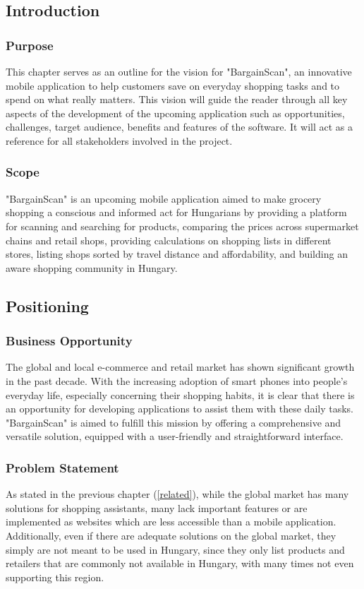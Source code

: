 \subsection{Introduction}

\subsubsection{Purpose}
This chapter serves as an outline for the vision for "BargainScan", an innovative mobile application to help customers save on everyday shopping tasks and to spend on what really matters. This vision will guide the reader through all key aspects of the development of the upcoming application such as opportunities, challenges, target audience, benefits and features of the software. It will act as a reference for all stakeholders involved in the project.

\subsubsection{Scope}
"BargainScan" is an upcoming mobile application aimed to make grocery shopping a conscious and informed act for Hungarians by providing a platform for scanning and searching for products, comparing the prices across supermarket chains and retail shops, providing calculations on shopping lists in different stores, listing shops sorted by travel distance and affordability, and building an aware shopping community in Hungary.

\subsection{Positioning}

\subsubsection{Business Opportunity}
The global and local e-commerce and retail market has shown significant growth in the past decade. With the increasing adoption of smart phones into people's everyday life, especially concerning their shopping habits, it is clear that there is an opportunity for developing applications to assist them with these daily tasks. "BargainScan" is aimed to fulfill this mission by offering a comprehensive and versatile solution, equipped with a user-friendly and straightforward interface.

\subsubsection{Problem Statement} 
As stated in the previous chapter (\ref{related}), while the global market has many solutions for shopping assistants, many lack important features or are implemented as websites which are less accessible than a mobile application. Additionally, even if there are adequate solutions on the global market, they simply are not meant to be used in Hungary, since they only list products and retailers that are commonly not available in Hungary, with many times not even supporting this region.

